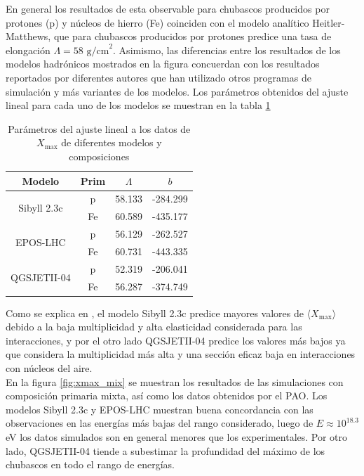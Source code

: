 En general los resultados de esta observable para chubascos producidos por protones (p) y núcleos de hierro (Fe) coinciden con el modelo analítico Heitler-Matthews, que para chubascos producidos por protones predice una tasa de elongación $\Lambda = 58 \text{ g/cm}^2$. Asimismo, las diferencias entre los resultados de los modelos hadrónicos mostrados en la figura concuerdan con los resultados reportados por diferentes autores \cite{Heck2003,Pierog2018,Bellido2017} que han utilizado otros programas de simulación y más variantes de los modelos. Los parámetros obtenidos del ajuste lineal para cada uno de los modelos se muestran en la tabla \ref{linear_params} \\

\begin{table}[] 
\centering
\caption{Parámetros del ajuste lineal a los datos de $X_{\text{max}}$ de diferentes modelos y composiciones}
\begin{tabular}{c|c|cc}
\hline
Modelo                       &  Prim  	& $\Lambda$ 	& $b$      \\ \hline
\multirow{2}{*}{Sibyll 2.3c} & 	p  		& 58.133    	& -284.299 \\  
                             & 	Fe 		& 60.589    	& -435.177 \\ \hline
\multirow{2}{*}{EPOS-LHC}    & 	p  		& 56.129    	& -262.527 \\  
                             & 	Fe 		& 60.731    	& -443.335 \\ \hline
\multirow{2}{*}{QGSJETII-04} & 	p  		& 52.319    	& -206.041 \\ 
                             & 	Fe 		& 56.287    	& -374.749 \\ \hline
\end{tabular}
\label{linear_params}
\end{table}

Como se explica en \cite{Pierog2018}, el modelo Sibyll 2.3c predice mayores valores de $\langle X_{\text{max}} \rangle$ debido a la baja multiplicidad y alta elasticidad considerada para las interacciones, y por el otro lado QGSJETII-04 predice los valores más bajos ya que considera la multiplicidad más alta y una sección eficaz baja en interacciones con núcleos del aire.\\

En la figura \ref{fig:xmax_mix} se muestran los resultados de las simulaciones con composición primaria mixta, así como los datos obtenidos por el PAO. Los modelos Sibyll 2.3c y EPOS-LHC muestran buena concordancia con las observaciones en las energías más bajas del rango considerado, luego de $E\approx 10^{18.3}$ eV los datos simulados son en general menores que los experimentales. Por otro lado, QGSJETII-04 tiende a subestimar la profundidad del máximo de los chubascos en todo el rango de energías.\\

